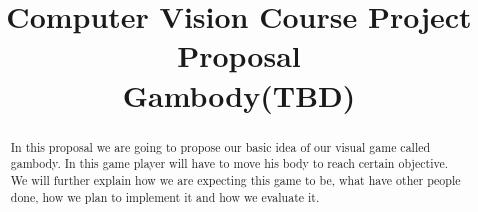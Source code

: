 \documentclass[conference,compsoc]{IEEEtran}
\begin{document}
\title{
	Computer Vision Course Project Proposal\\
	Gambody(TBD) \\
}


\author{
}

\maketitle

\begin{abstract}
	In this proposal we are going to propose our basic idea of our visual game called gambody. In this game player will have to move his body to reach certain objective. We will further explain how we are expecting this game to be, what have other people done, how we plan to implement it and how we evaluate it.
\end{abstract}
\end{document}
